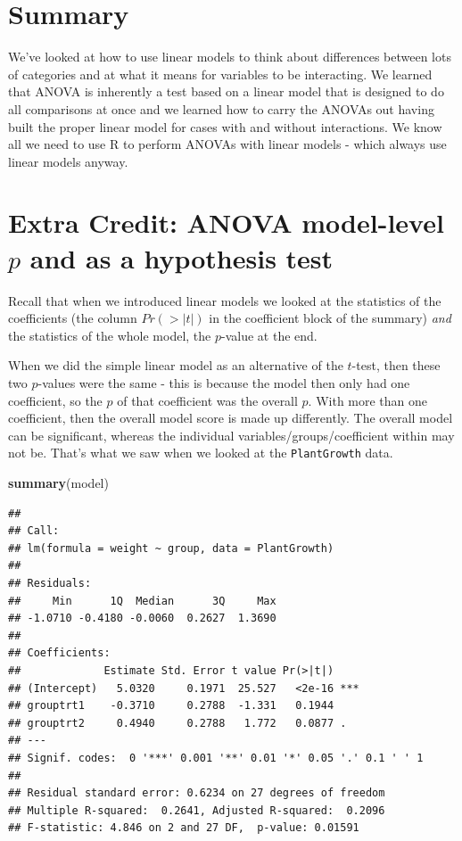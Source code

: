 \documentclass[
]{book}
\newenvironment{Shaded}{\begin{snugshade}}{\end{snugshade}}
\newcommand{\KeywordTok}[1]{\textcolor[rgb]{0.13,0.29,0.53}{\textbf{#1}}}
\newcommand{\NormalTok}[1]{#1}
\begin{document}
\hypertarget{summary}{%
\section{Summary}\label{summary}}

We've looked at how to use linear models to think about differences between lots of categories and at what it means for variables to be interacting. We learned that ANOVA is inherently a test based on a linear model that is designed to do all comparisons at once and we learned how to carry the ANOVAs out having built the proper linear model for cases with and without interactions. We know all we need to use R to perform ANOVAs with linear models - which always use linear models anyway.

\hypertarget{extra-credit-anova-model-level-p-and-as-a-hypothesis-test}{%
\section{\texorpdfstring{Extra Credit: ANOVA model-level \(p\) and as a hypothesis test}{Extra Credit: ANOVA model-level p and as a hypothesis test}}\label{extra-credit-anova-model-level-p-and-as-a-hypothesis-test}}

Recall that when we introduced linear models we looked at the statistics of the coefficients (the column \(Pr(>|t|)\) in the coefficient block of the summary) \emph{and} the statistics of the whole model, the \(p\)-value at the end.

When we did the simple linear model as an alternative of the \(t\)-test, then these two \(p\)-values were the same - this is because the model then only had one coefficient, so the \(p\) of that coefficient was the overall \(p\). With more than one coefficient, then the overall model score is made up differently. The overall model can be significant, whereas the individual variables/groups/coefficient within may not be. That's what we saw when we looked at the \texttt{PlantGrowth} data.

\begin{Shaded}
\begin{Highlighting}[]
\KeywordTok{summary}\NormalTok{(model)}
\end{Highlighting}
\end{Shaded}

\begin{verbatim}
## 
## Call:
## lm(formula = weight ~ group, data = PlantGrowth)
## 
## Residuals:
##     Min      1Q  Median      3Q     Max 
## -1.0710 -0.4180 -0.0060  0.2627  1.3690 
## 
## Coefficients:
##             Estimate Std. Error t value Pr(>|t|)    
## (Intercept)   5.0320     0.1971  25.527   <2e-16 ***
## grouptrt1    -0.3710     0.2788  -1.331   0.1944    
## grouptrt2     0.4940     0.2788   1.772   0.0877 .  
## ---
## Signif. codes:  0 '***' 0.001 '**' 0.01 '*' 0.05 '.' 0.1 ' ' 1
## 
## Residual standard error: 0.6234 on 27 degrees of freedom
## Multiple R-squared:  0.2641,	Adjusted R-squared:  0.2096 
## F-statistic: 4.846 on 2 and 27 DF,  p-value: 0.01591
\end{verbatim}
\end{document}
